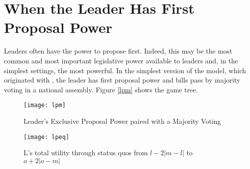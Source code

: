 \documentclass[12pt]{article}
\theoremstyle{plain}		      \newtheorem{assn}{Assumption}
\theoremstyle{plain}		      \newtheorem{prop}{Proposition}
\theoremstyle{plain}		      \newtheorem{lemma}{Lemma}
\theoremstyle{plain}	          \newtheorem{imp}{Implication}
\theoremstyle{plain}	          \newtheorem{hyp}{Hypothesis}
\theoremstyle{definition}		  \newtheorem{defn}{Definition}
\theoremstyle{remark}	          \newtheorem{rem}{Remark}
\theoremstyle{definition}         \newtheorem{case}{Case}
\begin{document}
\section{When the Leader Has First Proposal Power}
\indent Leaders often have the power to propose first. Indeed, this may be the most common and most important legislative power available to leaders and, in the simplest settings, the most powerful. 
In the simplest version of the model, which originated with \citet{romerrosenthal78}, the leader has first proposal power and bills pass by majority voting in a national assembly. Figure \ref{lpm} shows the game tree.  
\begin{figure}[h]
  \centering
  \begin{minipage}[b]{0.3\textwidth}
    \texttt{[image: lpm]}
    \caption{Leader's Exclusive Proposal Power paired with a Majority Voting}
    \label{lpm}
  \end{minipage}
  \hfill
  \begin{minipage}[b]{0.6\textwidth}
    \texttt{[image: lpeq]}
    \caption{L's total utility through status quos \newline from $l-2|m-l|$ to $o+2|o-m|$}
    \label{lpeq}
  \end{minipage}
\end{figure}
\FloatBarrier
\end{document}
